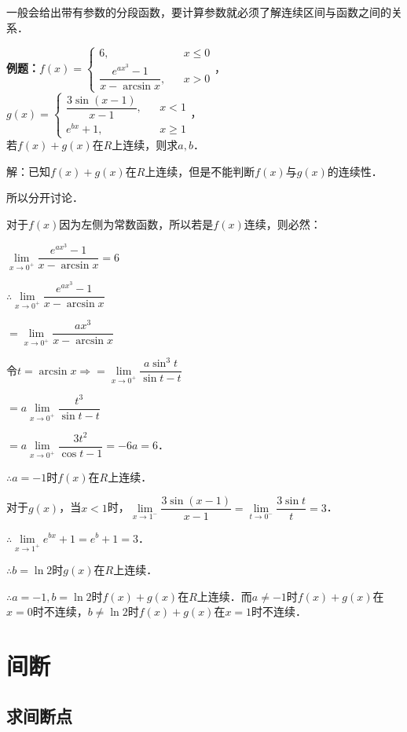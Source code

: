 一般会给出带有参数的分段函数，要计算参数就必须了解连续区间与函数之间的关系．

\textbf{例题：}$f(x)=\left\{\begin{array}{lcl}
        6,                               &  & x\leqslant 0 \\
        \dfrac{e^{ax^3}-1}{x-\arcsin x}, &  & x>0
    \end{array}
    \right.$，$g(x)=\left\{\begin{array}{lcl}
        \dfrac{3\sin(x-1)}{x-1}, &  & x<1          \\
        e^{bx}+1,                &  & x\geqslant 1
    \end{array}
    \right.$，\smallskip \\ 若$f(x)+g(x)$在$R$上连续，则求$a,b$．

解：已知$f(x)+g(x)$在$R$上连续，但是不能判断$f(x)$与$g(x)$的连续性．

所以分开讨论．

对于$f(x)$因为左侧为常数函数，所以若是$f(x)$连续，则必然：

$\lim\limits_{x\to 0^+}\dfrac{e^{ax^3}-1}{x-\arcsin x}=6$

$\therefore\lim\limits_{x\to 0^+}\dfrac{e^{ax^3}-1}{x-\arcsin x}$

$=\lim\limits_{x\to 0^+}\dfrac{ax^3}{x-\arcsin x}$

$\text{令}t=\arcsin x\Rightarrow=\lim\limits_{x\to 0^+}\dfrac{a\sin^3t}{\sin t-t}$

$=a\lim\limits_{x\to 0^+}\dfrac{t^3}{\sin t-t}$

$=a\lim\limits_{x\to 0^+}\dfrac{3t^2}{\cos t-1}=-6a=6$．

$\therefore a=-1$时$f(x)$在$R$上连续．

对于$g(x)$，当$x<1$时，$\lim\limits_{x\to 1^-}\dfrac{3\sin(x-1)}{x-1}=\lim\limits_{t\to 0^-}\dfrac{3\sin t}{t}=3$．

$\therefore\lim\limits_{x\to 1^+}e^{bx}+1=e^b+1=3$．

$\therefore b=\ln 2$时$g(x)$在$R$上连续．

$\therefore a=-1,b=\ln 2$时$f(x)+g(x)$在$R$上连续．而$a\neq -1$时$f(x)+g(x)$在$x=0$时不连续，$b\neq\ln 2$时$f(x)+g(x)$在$x=1$时不连续．

\section{间断}

\subsection{求间断点}

